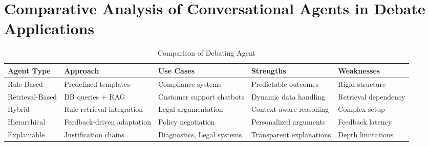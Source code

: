 \documentclass[conference]{IEEEtran}
\begin{document}
\section{Comparative Analysis of Conversational Agents in Debate Applications}
\begin{table}[h]
    \centering
    \caption{Comparison of Debating Agent}
    \label{tab:agents}
    \begin{tabular}{|>{\centering\arraybackslash}p{1.2cm}|>{\centering\arraybackslash}p{1.5cm}|>{\centering\arraybackslash}p{1.6cm}|>{\centering\arraybackslash}p{1.3cm}|>{\centering\arraybackslash}p{1.3cm}|}
    \hline
    \textbf{Agent Type}   & \textbf{Approach}                    & \textbf{Use Cases}                   & \textbf{Strengths}         & \textbf{Weaknesses}        \\ \hline
    Rule-Based           & Predefined templates                  & Compliance systems \cite{b12}        & Predictable outcomes       & Rigid structure            \\ \hline
    Retrieval-Based      & DB queries + RAG                      & Customer support chatbots \cite{b1}  & Dynamic data handling      & Retrieval dependency       \\ \hline
    Hybrid               & Rule-retrieval integration            & Legal argumentation \cite{b3}        & Context-aware reasoning    & Complex setup              \\ \hline
    Hierarchical         & Feedback-driven adaptation \cite{b5}  & Policy negotiation                   & Personalized arguments     & Feedback latency           \\ \hline
    Explainable          & Justification chains \cite{b13}       & Diagnostics, Legal systems           & Transparent explanations   & Depth limitations          \\ \hline
    \end{tabular}
\end{table}
\end{document}
